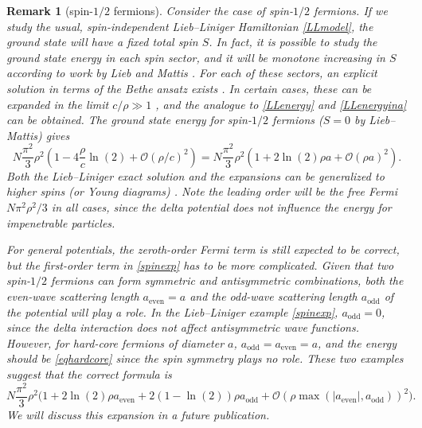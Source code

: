 \documentclass[a4paper,11pt]{article}
\newtheorem{remark}[theorem]{Remark}
\numberwithin{equation}{section}
\begin{document}
\begin{remark}[spin-$1/2$ fermions]
 Consider the case of spin-$1/2$ fermions. If we study the usual, spin-independent Lieb--Liniger Hamiltonian \eqref{LLmodel}, the ground state will have a fixed total spin $S$. In fact, it is possible to study the ground state energy in each spin sector, and it will be monotone increasing in $S$ according to work by Lieb and Mattis \cite{lieb1962theory}. For each of these sectors, an explicit solution in terms of the Bethe ansatz exists \cite{yang1967some,gaudin1967systeme}. In certain cases, these can be expanded in the limit $c/\rho\gg1$ \cite{guan2011analytical}, and the analogue to \eqref{LLenergy} and \eqref{LLenergyina} can be obtained. The ground state energy for spin-$1/2$ fermions ($S=0$ by Lieb--Mattis) gives \cite{girardeau2006ground,guan2011analytical}
\begin{equation}
\label{spinexp}
N\frac{\pi^2}{3}\rho^2\left(1-4\frac{\rho}{c}\ln(2)+\mathcal{O}(\rho/c)^2\right)=N\frac{\pi^2}{3}\rho^2\left(1+2\ln(2)\rho a+\mathcal{O}(\rho a)^2\right).
\end{equation}
Both the Lieb--Liniger exact solution and the expansions can be generalized to higher spins (or Young diagrams) \cite{sutherland1968further,guan2012one}. Note the leading order will be the free Fermi $N\pi^2\rho^2/3$ in all cases, since the delta potential does not influence the energy for impenetrable particles.

For general potentials, the zeroth-order Fermi term is still expected to be correct, but the first-order term in \eqref{spinexp} has to be more complicated. Given that two spin-$1/2$ fermions can form symmetric and antisymmetric combinations, both the even-wave scattering length $a_{\text{even}}=a$ and the odd-wave scattering length $a_{\text{odd}}$ of the potential will play a role. In the Lieb--Liniger example \eqref{spinexp}, $a_{\text{odd}}=0$, since the delta interaction does not affect antisymmetric wave functions. However, for hard-core fermions of diameter $a$, $a_{\text{odd}}=a_{\text{even}}=a$, and the energy should be \eqref{eqhardcore} since the spin symmetry plays no role. These two examples suggest that the correct formula is
\begin{equation}
N\frac{\pi^2}{3}\rho^2\big(1+2\ln(2)\rho a_{\text{even}}+2(1-\ln(2))\rho a_{\text{odd}}+\mathcal{O}(\rho \max(|a_{\text{even}}|,a_{\text{odd}}))^2\big).  
\end{equation}
We will discuss this expansion in a future publication.
\end{remark}
\end{document}
